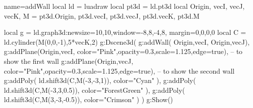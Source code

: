 \begin{luadraw}{name=addWall}
local ld = luadraw
local pt3d = ld.pt3d
local Origin, vecI, vecJ, vecK, M = pt3d.Origin, pt3d.vecI, pt3d.vecJ, pt3d.vecK, pt3d.M

local g = ld.graph3d:new{size={10,10},window={-8,8,-4,8}, margin={0,0,0,0}}
local C = ld.cylinder(M(0,0,-1),5*vecK,2)
g:Dscene3d(
    g:addWall( {{Origin,vecI}, {Origin,vecJ}}),
    g:addPlane({Origin,vecI}, {color="Pink",opacity=0.3,scale=1.125,edge=true}), -- to show the first wall
    g:addPlane({Origin,vecJ}, {color="Pink",opacity=0.3,scale=1.125,edge=true}), -- to show the second wall
    g:addPoly( ld.shift3d(C,M(-3,-3,1)), {color="Cyan"} ),
    g:addPoly( ld.shift3d(C,M(-3,3,0.5)), {color="ForestGreen"} ),
    g:addPoly( ld.shift3d(C,M(3,-3,-0.5)), {color="Crimson"} )
)
g:Show()
\end{luadraw}
